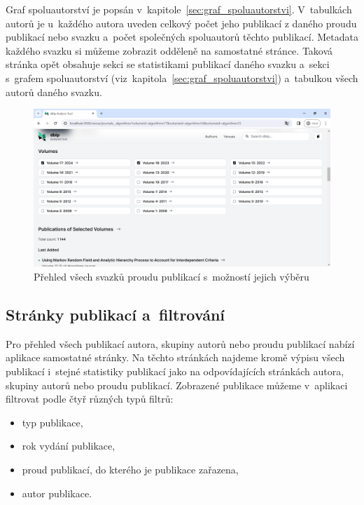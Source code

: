 \documentclass[
  biblatex,
  sourcecodes,
  glossaries,
  index
]{kidiplom}
\begin{document}
Graf spoluautorství je popsán v~kapitole~\ref{sec:graf_spoluautorstvi}. V~tabulkách autorů je u~každého autora uveden celkový počet jeho publikací z daného proudu publikací nebo svazku a~počet společných spoluautorů těchto publikací. Metadata každého svazku si můžeme zobrazit odděleně na samostatné stránce. Taková stránka opět obsahuje sekci se statistikami publikací daného svazku a~sekci s~grafem spoluautorství (viz~kapitola~\ref{sec:graf_spoluautorstvi}) a~tabulkou všech autorů daného svazku.

\begin{figure}[H]
\begin{center}
\includegraphics[width=\textwidth]{stranka_proudu_publikaci_svazky}
\caption{Přehled všech svazků proudu publikací s~možností jejich výběru}\label{fig:stranka_proudu_publikaci_svazky}
\end{center}
\end{figure}

\subsection{Stránky publikací a~filtrování}

Pro přehled všech publikací autora, skupiny autorů nebo proudu publikací nabízí aplikace samostatné stránky. Na těchto stránkách najdeme kromě výpisu všech publikací i~stejné statistiky publikací jako na odpovídajících stránkách autora, skupiny autorů nebo proudu publikací. Zobrazené publikace můžeme v~aplikaci filtrovat podle čtyř různých typů filtrů:
\begin{itemize}
\item typ publikace,
\item rok vydání publikace,
\item proud publikací, do kterého je publikace zařazena,
\item autor publikace.
\end{itemize}
\end{document}
